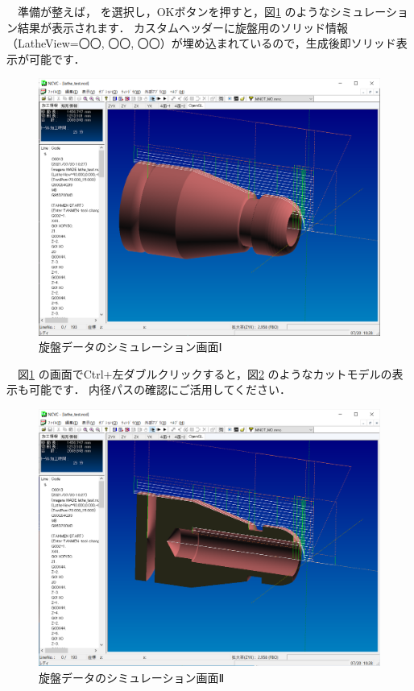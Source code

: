 

\vspace*{1zh}
　準備が整えば， を選択し，OKボタンを押すと，図\ref{fig:simu1.png} のようなシミュレーション結果が表示されます．
カスタムヘッダーに旋盤用のソリッド情報（LatheView=〇〇, 〇〇, 〇〇）が埋め込まれているので，生成後即ソリッド表示が可能です．

\begin{figure}[H]
\centering
\includegraphics[scale=0.5]{No3/fig/simu1.png}
\caption{旋盤データのシミュレーション画面Ⅰ}
\label{fig:simu1.png}
\end{figure}

　図\ref{fig:simu1.png} の画面でCtrl+左ダブルクリックすると，図\ref{fig:simu2.png} のようなカットモデルの表示も可能です．
内径パスの確認にご活用してください．

\begin{figure}[H]
\centering
\includegraphics[scale=0.5]{No3/fig/simu2.png}
\caption{旋盤データのシミュレーション画面Ⅱ}
\label{fig:simu2.png}
\end{figure}

